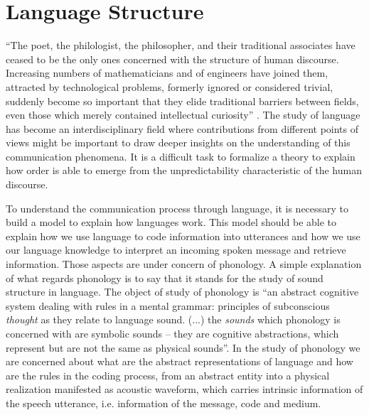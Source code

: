 \chapter{Language Structure}
``The poet, the philologist, the philosopher, and their traditional associates have ceased
to be the only ones concerned with the structure of human discourse. Increasing numbers
of mathematicians and of engineers have joined them, attracted by technological problems,
formerly ignored or considered trivial, suddenly become so important that they elide traditional
barriers between fields, even those which merely contained intellectual curiosity'' \citep{mandelbrot1965}.
The study of language has become an interdisciplinary field
where contributions from different points of views might be important to draw deeper insights
on the understanding of this communication phenomena. It is a difficult task
to formalize a theory to explain how order is able to emerge from the unpredictability characteristic 
of the human discourse.

To understand the communication process through language, it is necessary to build a model to explain how languages work. 
This model should be able to explain how we use language to code information into utterances and how we use our language knowledge 
to interpret an incoming spoken message and retrieve information. Those aspects are under concern 
of phonology. A simple explanation of what regards phonology is to say that it stands for the study of sound structure in language. 
The object of study of phonology is ``an abstract cognitive system dealing with rules in a mental grammar: principles of subconscious 
\textit{thought} as they relate to language sound. (...) the \textit{sounds} which phonology is concerned with are symbolic sounds -- 
they are cognitive abstractions, which represent but are not the same as physical sounds''\citep{odden2005}. 
In the study of phonology we are concerned about what are the abstract representations of language and how are the rules in 
the coding process, from an abstract entity into a physical realization manifested as acoustic waveform, which carries 
intrinsic information of the speech utterance, i.e. information of the message, code and medium.

